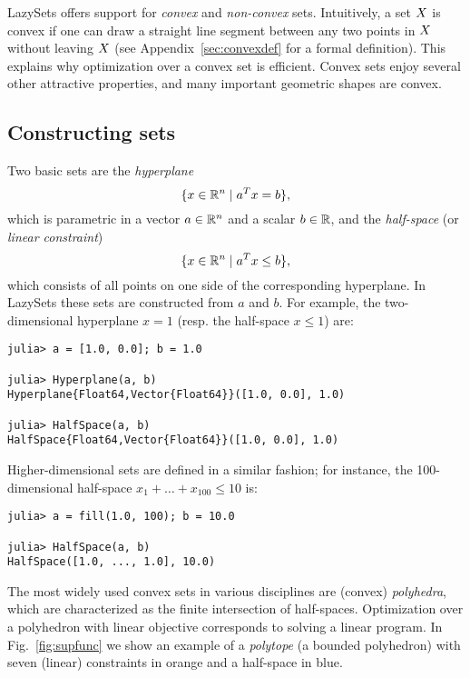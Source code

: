 LazySets offers support for \emph{convex} and \emph{non-convex} sets.
%
Intuitively, a set $X$ is convex if one can draw a straight line segment between any two points in $X$ without leaving $X$ (see Appendix~\ref{sec:convexdef} for a formal definition).
This explains why optimization over a convex set is efficient.
Convex sets enjoy several other attractive properties, and many important geometric shapes are convex.
%

\subsection{Constructing sets}

Two basic sets are the \emph{hyperplane}
%
\[
	\{x \in \mathbb{R}^n \mid a^T x = b\},
\]
%
which is parametric in a vector $a \in \mathbb{R}^n$ and a scalar $b \in \mathbb{R}$, and the \emph{half-space} (or \emph{linear constraint})
%
\[
	\{x \in \mathbb{R}^n \mid a^T x \leq b\},
\]
%
which consists of all points on one side of the corresponding hyperplane.
In LazySets these sets are constructed from $a$ and $b$. For example, the two-dimensional hyperplane $x = 1$ (resp. the half-space $x \leq 1$) are:

\begin{minipage}{\linewidth}
\begin{lstlisting}
julia> a = [1.0, 0.0]; b = 1.0

julia> Hyperplane(a, b)
Hyperplane{Float64,Vector{Float64}}([1.0, 0.0], 1.0)

julia> HalfSpace(a, b)
HalfSpace{Float64,Vector{Float64}}([1.0, 0.0], 1.0)
\end{lstlisting}
\end{minipage}
Higher-dimensional sets are defined in a similar fashion; for instance, the 100-dimensional half-space $x_1 + \ldots + x_{100} \leq 10$ is:
\begin{minipage}{\linewidth}
	\begin{lstlisting}
julia> a = fill(1.0, 100); b = 10.0

julia> HalfSpace(a, b)
HalfSpace([1.0, ..., 1.0], 10.0)
	\end{lstlisting}
\end{minipage}


The most widely used convex sets in various disciplines are (convex) \emph{polyhedra}, which are characterized as the finite intersection of half-spaces.
Optimization over a polyhedron with linear objective corresponds to solving a linear program.
In Fig.~\ref{fig:supfunc} we show an example of a \emph{polytope} (a bounded polyhedron) with seven (linear) constraints in orange and a half-space in blue.

